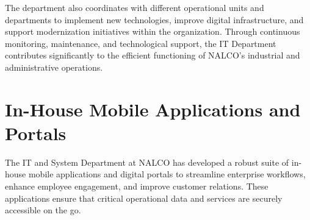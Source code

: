 The department also coordinates with different operational units and departments to implement new technologies, improve digital infrastructure, and support modernization initiatives within the organization. Through continuous monitoring, maintenance, and technological support, the IT Department contributes significantly to the efficient functioning of NALCO’s industrial and administrative operations.

\section{In-House Mobile Applications and Portals}

The IT and System Department at NALCO has developed a robust suite of in-house mobile applications and digital portals to streamline enterprise workflows, enhance employee engagement, and improve customer relations. These applications ensure that critical operational data and services are securely accessible on the go.

